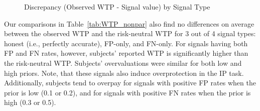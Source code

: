 \documentclass[12pt,a4paper]{article}
\begin{document}
\begin{figure}[H]\centering 
	\caption{Discrepancy (Observed WTP - Signal value) by Signal Type} \label{fig:WTPhist}
	\hfill
	\hfill
	\vspace{2em}
	\hfill
	\hfill

\end{figure}

Our comparisons in Table~\ref{tab:WTP_nonpar} also find no differences on average between the observed WTP and the risk-neutral WTP for 3 out of 4 signal types: honest (i.e., perfectly accurate), FP-only, and FN-only. For signals having both FP and FN rates, however, subjects' reported WTP is significantly higher than the risk-neutral WTP. Subjects' overvaluations were similar for both low and high priors. Note, that these signals also induce overprotection in the IP task. Additionally, subjects tend to overpay for signals with positive FP rates when the prior is low (0.1 or 0.2), and for signals with positive FN rates when the prior is high (0.3 or 0.5).
\end{document}

